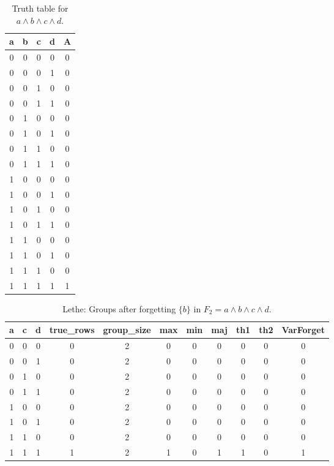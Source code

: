 \begin{table}[!tb]
    \centering
    \begin{tabular}{|c|c|c|c|c|}
        \hline
        \textbf{a} & \textbf{b} & \textbf{c} & \textbf{d} & \textbf{A} \\ \hline
        0 & 0 & 0 & 0 & 0 \\ \hline
        0 & 0 & 0 & 1 & 0 \\ \hline
        0 & 0 & 1 & 0 & 0 \\ \hline
        0 & 0 & 1 & 1 & 0 \\ \hline
        0 & 1 & 0 & 0 & 0 \\ \hline
        0 & 1 & 0 & 1 & 0 \\ \hline
        0 & 1 & 1 & 0 & 0 \\ \hline
        0 & 1 & 1 & 1 & 0 \\ \hline
        1 & 0 & 0 & 0 & 0 \\ \hline
        1 & 0 & 0 & 1 & 0 \\ \hline
        1 & 0 & 1 & 0 & 0 \\ \hline
        1 & 0 & 1 & 1 & 0 \\ \hline
        1 & 1 & 0 & 0 & 0 \\ \hline
        1 & 1 & 0 & 1 & 0 \\ \hline
        1 & 1 & 1 & 0 & 0 \\ \hline
        1 & 1 & 1 & 1 & 1 \\ \hline
    \end{tabular}
    \caption{Truth table for $a \land b \land c \land d$.}
    \label{tab:truthtab}
\end{table}

\begin{table}[!tb]
    \centering
    \begin{tabular}{|c|c|c|c|c|c|c|c|c|c|c|}
        \hline
        \textbf{a} & \textbf{c} & \textbf{d} & \textbf{true\_rows} & \textbf{group\_size} & \textbf{max} & \textbf{min} & \textbf{maj} & \textbf{th1} & \textbf{th2} & \textbf{VarForget} \\ \hline
        \rowcolor{gray!40} 0 & 0 & 0 & 0 & 2 & 0 & 0 & 0 & 0 & 0 & 0 \\ \hline
        \rowcolor{blue!40} 0 & 0 & 1 & 0 & 2 & 0 & 0 & 0 & 0 & 0 & 0 \\ \hline
        \rowcolor{red!40} 0 & 1 & 0 & 0 & 2 & 0 & 0 & 0 & 0 & 0 & 0 \\ \hline
        \rowcolor{green!40} 0 & 1 & 1 & 0 & 2 & 0 & 0 & 0 & 0 & 0 & 0 \\ \hline
        \rowcolor{yellow!40} 1 & 0 & 0 & 0 & 2 & 0 & 0 & 0 & 0 & 0 & 0 \\ \hline
        \rowcolor{gray!40} 1 & 0 & 1 & 0 & 2 & 0 & 0 & 0 & 0 & 0 & 0 \\ \hline
        \rowcolor{blue!40} 1 & 1 & 0 & 0 & 2 & 0 & 0 & 0 & 0 & 0 & 0 \\ \hline
        \rowcolor{red!40} 1 & 1 & 1 & 1 & 2 & 1 & 0 & 1 & 1 & 0 & 1 \\ \hline
    \end{tabular}
    \caption{Lethe: Groups after forgetting $\{b\}$ in $F_{2} = a \land b \land c \land d$.}
    \label{tab:lethe-F2-b-groups}
\end{table}
